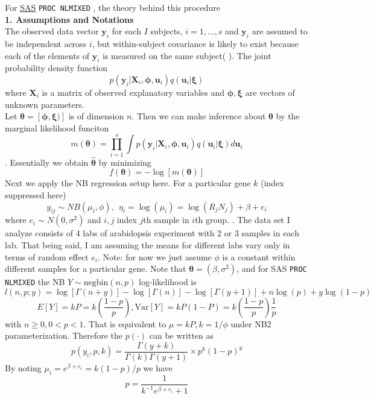 \documentclass[paper=a4, fontsize=12.5pt]{scrartcl} %
\numberwithin{equation}{section} %
\numberwithin{figure}{section} %
\numberwithin{table}{section} %
\begin{document}
For  \href{http://support.sas.com/documentation/cdl/en/statug/63033/HTML/default
/viewer.htm#statug_nlmixed_sect022.htm}{SAS} \verb"PROC NLMIXED" , the theory behind this procedure \\
\textbf{1. Assumptions and Notations}\\
  The observed data vector $\bm y_i$ for each $I$ subjects, $i=1, \ldots, s$ and $\bm y_i$ are assumed to be independent across $i$, but within-subject covariance is likely to exist because each of the elements of $\bm y_i$ is measured on the same subject( {\color{blue}{that implies it can deal with repeated measurement}}). The joint probability density function 
  \[p(\bm y_i|\bm X_i, \bm \phi, \bm u_i)q(\bm u_i|\bm \xi)\]
  where $\bm X_i$ is a matrix of observed explanatory variables and $\bm \phi, \bm \xi$ are vectors of unknown parameters.\\
  Let $\bm \theta =[\bm \phi, \bm \xi)]$ is of dimension $n$. Then we can make inference about $\bm\theta$ by the marginal likelihood funciton
  \[m(\bm \theta)= \prod_{i=1}^s\int p(\bm y_i|\bm X_i, \bm \phi, \bm u_i)q(\bm u_i|\bm \xi)d\bm u_i\]. Essentially we obtain $\hat{\bm \theta}$ by minimizing 
  $$f(\bm \theta)= -\log [m(\bm \theta)]$$
 Next we apply the NB regression setup here. For a particular gene $k$ (index suppressed here)
  \[y_{ij} \sim NB(\mu_i, \phi), ~~ \eta_i = \log(\mu_i)= \log(R_jN_j)+\beta + e_i\]
  where $e_i\sim N(0, \sigma^2)$ and $i, j$ index $j$th sample in $i$th group. {\color{blue}{not sure if normalization is needed yet, in which case we might begin with $\log(\mu_i)= \beta + \log (N_i R_i) + e_i$}}. The data set I analyze consists of 4 labs of arabidopsis experiment with 2 or 3 samples in each lab. That being said, I am assuming the means for different labs vary only in terms of random effect $e_i$.  {\color{blue} Note: for now we just assume $\phi$ is a constant within different samples for a particular gene.}
  Note that $\bm \theta= (\beta, \sigma^2)$, and for SAS \verb"PROC NLMIXED" the NB $Y\sim \text{negbin}(n, p)$ log-likelihood is 
  \[  l(n, p; y)= \log[\Gamma(n+y)]- \log[\Gamma(n)] - \log[\Gamma(y +1)] + n\log(p) + y\log(1-p)\]
  \[E[Y] = kP = k\left(\frac{1-p}{p}\right), \text{Var}[Y] = kP(1-P) = k \left(\frac{1-p}{p}\right)\frac{1}{p}\] 
  with $n \geq 0 , 0 <p < 1$. That is equivalent to $\mu = kP, k = 1/\phi$  under NB2 parameterization.  Therefore the $p(\cdot)$ can be written as 
  \[p(y_i, p, k)= \frac{\Gamma(y+ k)}{\Gamma(k)\Gamma(y + 1)}\times p^k(1-p)^y\]
  By noting $\mu_i= e^{\beta + e_i}= k(1-p)/p$ we have  
  \[ p =  \frac{1}{k^{-1}e^{\beta  + e_i} + 1}\]
\end{document}

